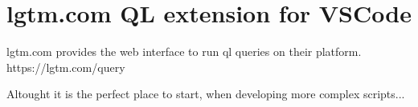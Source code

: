 
\section{lgtm.com QL extension for VSCode}

lgtm.com provides the web interface to run ql queries on their platform.
https://lgtm.com/query

Altought it is the perfect place to start, when developing more complex scripts...

